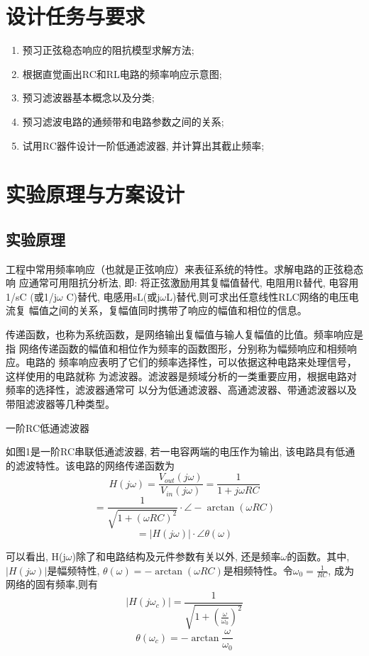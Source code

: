 \documentclass[10pt, a4paper]{article} %
\begin{document}
\section{设计任务与要求}

\begin{enumerate}[leftmargin=50pt,label=(\arabic*)] %
    \item 预习正弦稳态响应的阻抗模型求解方法;
    \item 根据直觉画出RC和RL电路的频率响应示意图;
    \item 预习滤波器基本概念以及分类;
    \item 预习滤波电路的通频带和电路参数之间的关系;
    \item 试用RC器件设计一阶低通滤波器, 并计算出其截止频率;
\end{enumerate}

\section{实验原理与方案设计}
\subsection{实验原理}
工程中常用频率响应（也就是正弦响应）来表征系统的特性。求解电路的正弦稳态响
应通常可用阻抗分析法, 即: 将正弦激励用其复幅值替代, 电阻用R替代, 电容用1/sC
(或1/j$\omega$ C)替代, 电感用sL(或j$\omega$L)替代,则可求出任意线性RLC网络的电压电流复
幅值之间的关系，复幅值同时携带了响应的幅值和相位的信息。

传递函数，也称为系统函数，是网络输出复幅值与输人复幅值的比值。频率响应是指
网络传递函数的幅值和相位作为频率的函数图形，分别称为幅频响应和相频响应。电路的
频率响应表明了它们的频率选择性，可以依据这种电路来处理信号，这样使用的电路就称
为滤波器。滤波器是频域分析的一类重要应用，根据电路对频率的选择性，滤波器通常可
以分为低通滤波器、高通滤波器、带通滤波器以及带阻滤波器等几种类型。


一阶RC低通滤波器


如图1是一阶RC串联低通滤波器, 若一电容两端的电压作为输出, 该电路具有低通的滤波特性。该电路的网络传递函数为
$$
H(j\omega) = \frac{V_{out}(j\omega)}{V_{in}(j\omega)} = \frac{1}{1 + j\omega RC}
$$
$$
=\frac{1}{\sqrt{1 + (\omega RC)^2}} \cdot \angle - \arctan(\omega RC)
$$
$$
=\left\lvert H(j\omega)\right\rvert \cdot \angle \theta (\omega)
$$

可以看出, H(j$\omega$)除了和电路结构及元件参数有关以外, 还是频率$\omega$的函数。其中, $\left\lvert H(j\omega)\right\rvert$是幅频特性, $\theta(\omega) = -\arctan(\omega RC)$是相频特性。令$\omega_0= \frac{1}{RC}$, 成为网络的固有频率,则有
$$
\left\lvert H(j\omega_c)\right\rvert = \frac{1}{\sqrt{1+(\frac{\omega}{\omega_0})^2}}
$$
$$
\theta(\omega_c) = -\arctan\frac{\omega}{\omega_0}
$$
\end{document}
